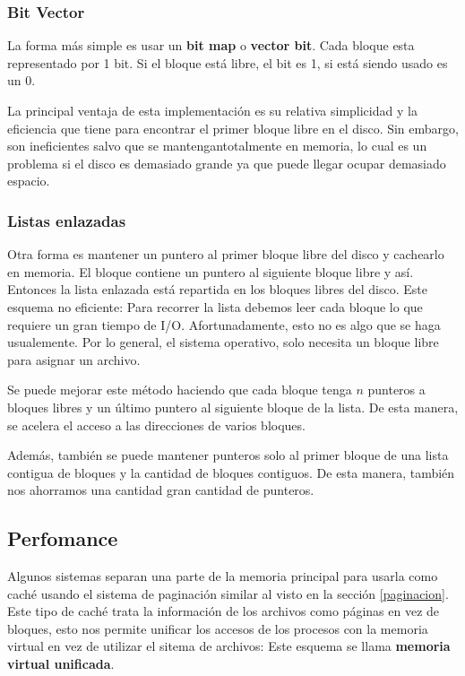 \subsubsection{Bit Vector}
La forma más simple es usar un \textbf{bit map} o \textbf{vector bit}. Cada bloque esta representado por 1 bit. Si el bloque está libre, el bit es 1, si está siendo usado es un 0.

La principal ventaja de esta implementación es su relativa simplicidad y la eficiencia que tiene para encontrar el primer bloque libre en el disco. Sin embargo, son ineficientes salvo que se mantengantotalmente en memoria, lo cual es un problema si el disco es demasiado grande ya que puede llegar ocupar demasiado espacio.

\subsubsection{Listas enlazadas}
Otra forma es mantener un puntero al primer bloque libre del disco y cachearlo en memoria. El bloque contiene un puntero al siguiente bloque libre y así. Entonces la lista enlazada está repartida en los bloques libres del disco. Este esquema no eficiente: Para recorrer la lista debemos leer cada bloque lo que requiere un gran tiempo de I/O. Afortunadamente, esto no es algo que se haga usualemente. Por lo general, el sistema operativo, solo necesita un bloque libre para asignar un archivo. 

Se puede mejorar este método haciendo que cada bloque tenga $n$ punteros a bloques libres y un último puntero al siguiente bloque de la lista. De esta manera, se acelera el acceso a las direcciones de varios bloques.

Además, también se puede mantener punteros solo al primer bloque de una lista contigua de bloques y la cantidad de bloques contiguos. De esta manera, también nos ahorramos una cantidad gran cantidad de punteros.

\subsection{Perfomance}
Algunos sistemas separan una parte de la memoria principal para usarla como caché usando el sistema de paginación similar al visto en la sección \ref{paginacion}. Este tipo de caché trata la información de los archivos como páginas en vez de bloques, esto nos permite unificar los accesos de los procesos con la memoria virtual en vez de utilizar el sitema de archivos: Este esquema se llama \textbf{memoria virtual unificada}.

